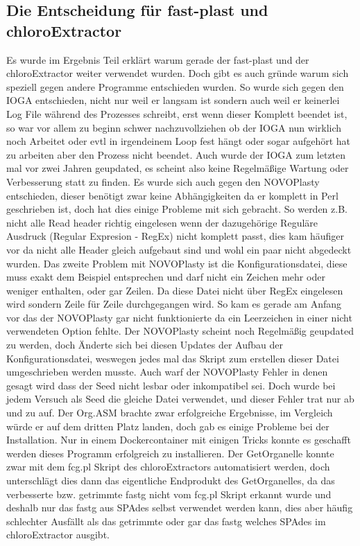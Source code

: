 \documentclass{scrartcl}
\begin{document}
\subsection{Die Entscheidung für fast-plast und chloroExtractor}
\label{sec-5-2}
Es wurde im Ergebnis Teil erklärt warum gerade der fast-plast und der chloroExtractor weiter verwendet wurden. Doch gibt es auch gründe warum sich speziell gegen andere Programme entschieden wurden. 
So wurde sich gegen den IOGA entschieden, nicht nur weil er langsam ist sondern auch weil er keinerlei Log File während des Prozesses schreibt, erst wenn dieser Komplett beendet ist, so war vor allem zu beginn 
 schwer nachzuvollziehen ob der IOGA nun wirklich noch Arbeitet oder evtl in irgendeinem Loop fest hängt oder sogar aufgehört hat zu arbeiten aber den Prozess nicht beendet. Auch wurde der IOGA zum letzten mal 
vor zwei Jahren geupdated, es scheint also keine Regelmäßige Wartung oder Verbesserung statt zu finden. Es wurde sich auch gegen den NOVOPlasty entschieden, dieser benötigt zwar keine Abhängigkeiten da er komplett 
in Perl geschrieben ist, doch hat dies einige Probleme mit sich gebracht. So werden z.B. nicht alle Read header richtig eingelesen wenn der dazugehörige Reguläre Ausdruck (Regular Expresion - RegEx) nicht komplett passt, dies kam häufiger 
vor da nicht alle Header gleich aufgebaut sind und wohl ein paar nicht abgedeckt wurden. Das zweite Problem mit NOVOPlasty ist die Konfigurationsdatei, diese muss exakt dem Beispiel entsprechen und darf nicht ein Zeichen mehr
oder weniger enthalten, oder gar Zeilen. Da diese Datei nicht über RegEx eingelesen wird sondern Zeile für Zeile durchgegangen wird. So kam es gerade am Anfang vor das der NOVOPlasty gar nicht funktionierte da ein Leerzeichen 
in einer nicht verwendeten Option fehlte. Der NOVOPlasty scheint noch Regelmäßig geupdated zu werden, doch Änderte sich bei diesen Updates der Aufbau der Konfigurationsdatei, weswegen jedes mal das Skript zum erstellen dieser
Datei umgeschrieben werden musste. Auch warf der NOVOPlasty Fehler in denen gesagt wird dass der Seed nicht lesbar oder inkompatibel sei. Doch wurde bei jedem Versuch als Seed die gleiche Datei verwendet, und dieser Fehler trat nur ab und zu auf.
Der Org.ASM brachte zwar erfolgreiche Ergebnisse, im Vergleich würde er auf dem dritten Platz landen, doch gab es einige Probleme bei der Installation. Nur in einem
Dockercontainer mit einigen Tricks konnte es geschafft werden dieses Programm erfolgreich zu installieren. Der GetOrganelle konnte zwar mit dem fcg.pl Skript des chloroExtractors automatisiert werden, doch unterschlägt
dies dann das eigentliche Endprodukt des GetOrganelles, da das verbesserte bzw. getrimmte fastg nicht vom fcg.pl Skript erkannt wurde und deshalb nur das fastg aus SPAdes selbst verwendet werden kann, dies aber häufig schlechter
Ausfällt als das getrimmte oder gar das fastg welches SPAdes im chloroExtractor ausgibt. 
\end{document}
